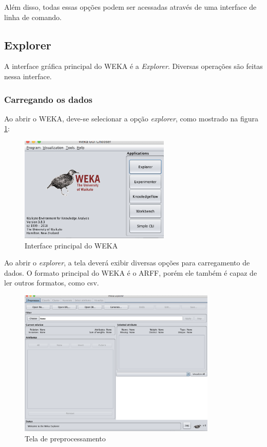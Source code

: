 Além disso, todas essas opções podem ser acessadas através de uma interface de linha de comando.

\subsection{Explorer}
A interface gráfica principal do WEKA é a \textit{Explorer}. Diversas operações são feitas nessa interface.

\subsubsection{Carregando os dados}
Ao abrir o WEKA, deve-se selecionar a opção \textit{explorer}, como mostrado na figura \ref{explorer}:

\begin{figure}[H]
\centering
\includegraphics[height=5cm]{imagens/wekaprincipal.png}
\caption{Interface principal do WEKA}
\label{explorer}
\end{figure}

Ao abrir o \textit{explorer}, a tela deverá exibir diversas opções para carregamento de dados. O formato principal do WEKA é o ARFF, porém ele também é capaz de ler outros formatos, como csv.

\begin{figure}[H]
\centering
\includegraphics[height=7cm]{imagens/wekapreprocessempty.png}
\caption{Tela de preprocessamento}
\label{figura19}
\end{figure}

